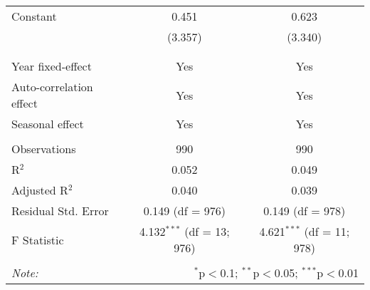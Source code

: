 \begin{table}[!htbp]
\begin{tabular}{@{\extracolsep{5pt}}lcc}
 Constant & 0.451 & 0.623 \\ 
  & (3.357) & (3.340) \\ 
  & & \\ 
\hline \\[-1.8ex] 
Year fixed-effect & Yes & Yes \\ 
Auto-correlation effect & Yes & Yes \\ 
Seasonal effect & Yes & Yes \\ 
\hline \\[-1.8ex] 
Observations & 990 & 990 \\ 
R$^{2}$ & 0.052 & 0.049 \\ 
Adjusted R$^{2}$ & 0.040 & 0.039 \\ 
Residual Std. Error & 0.149 (df = 976) & 0.149 (df = 978) \\ 
F Statistic & 4.132$^{***}$ (df = 13; 976) & 4.621$^{***}$ (df = 11; 978) \\ 
\hline 
\hline \\[-1.8ex] 
\textit{Note:}  & \multicolumn{2}{r}{$^{*}$p$<$0.1; $^{**}$p$<$0.05; $^{***}$p$<$0.01} \\ 
\end{tabular} 
\end{table} 
